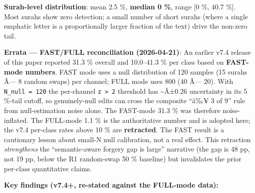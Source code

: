 \documentclass[
]{article}
\begin{document}
\textbf{Surah-level distribution}: mean 2.5 \%, \textbf{median 0 \%},
range {[}0 \%, 40.7 \%{]}. Most surahs show zero detection; a small
number of short surahs (where a single emphatic letter is a
proportionally larger fraction of the text) drive the non-zero tail.

\textbf{Errata --- FAST/FULL reconciliation (2026-04-21)}: An earlier
v7.4 release of this paper reported 31.3 \% overall and 10.0--41.3 \%
per class based on \textbf{FAST-mode numbers}. FAST mode uses a null
distribution of 120 samples (15 surahs Ã--- 8 random swaps) per channel;
FULL mode uses 800 (40 Ã--- 20). With \texttt{N\_null\ =\ 120} the
per-channel \texttt{\textbar{}z\textbar{}\ \textgreater{}\ 2} threshold
has \textasciitilde Â±0.26 uncertainty in its 5 \%-tail cutoff, so
genuinely-null edits can cross the composite ``â‰¥ 3 of 9'' rule from
null-estimation noise alone. The FAST-mode 31.3 \% was therefore
noise-inflated. The FULL-mode 1.1 \% is the authoritative number and is
adopted here; the v7.4 per-class rates above 10 \% are
\textbf{retracted}. The FAST result is a cautionary lesson about small-N
null calibration, not a real effect. This retraction \emph{strengthens}
the ``semantic-aware forgery gap is large'' narrative (the gap is 48 pp,
not 19 pp, below the R1 random-swap 50 \% baseline) but invalidates the
prior per-class quantitative claims.

\textbf{Key findings (v7.4+, re-stated against the FULL-mode data):}
\end{document}

